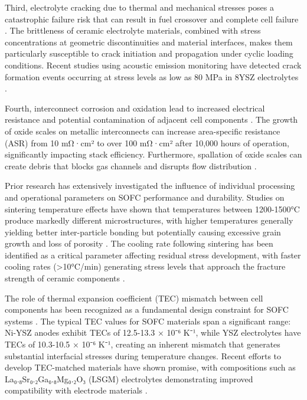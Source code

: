 \documentclass[conference]{IEEEtran}
\begin{document}
Third, electrolyte cracking due to thermal and mechanical stresses poses a catastrophic failure risk that can result in fuel crossover and complete cell failure \cite{nakajo2024mechanical}. The brittleness of ceramic electrolyte materials, combined with stress concentrations at geometric discontinuities and material interfaces, makes them particularly susceptible to crack initiation and propagation under cyclic loading conditions. Recent studies using acoustic emission monitoring have detected crack formation events occurring at stress levels as low as 80 MPa in 8YSZ electrolytes \cite{roberts2024fracture}.

Fourth, interconnect corrosion and oxidation lead to increased electrical resistance and potential contamination of adjacent cell components \cite{piccardo2024interconnect}. The growth of oxide scales on metallic interconnects can increase area-specific resistance (ASR) from 10 mΩ·cm² to over 100 mΩ·cm² after 10,000 hours of operation, significantly impacting stack efficiency. Furthermore, spallation of oxide scales can create debris that blocks gas channels and disrupts flow distribution \cite{leonard2024oxidation}.

Prior research has extensively investigated the influence of individual processing and operational parameters on SOFC performance and durability. Studies on sintering temperature effects have shown that temperatures between 1200-1500°C produce markedly different microstructures, with higher temperatures generally yielding better inter-particle bonding but potentially causing excessive grain growth and loss of porosity \cite{tietz2024sintering}. The cooling rate following sintering has been identified as a critical parameter affecting residual stress development, with faster cooling rates (>10°C/min) generating stress levels that approach the fracture strength of ceramic components \cite{fischer2024thermal}.

The role of thermal expansion coefficient (TEC) mismatch between cell components has been recognized as a fundamental design constraint for SOFC systems \cite{ferguson2024materials}. The typical TEC values for SOFC materials span a significant range: Ni-YSZ anodes exhibit TECs of 12.5-13.3 × 10⁻⁶ K⁻¹, while YSZ electrolytes have TECs of 10.3-10.5 × 10⁻⁶ K⁻¹, creating an inherent mismatch that generates substantial interfacial stresses during temperature changes. Recent efforts to develop TEC-matched materials have shown promise, with compositions such as La₀.₈Sr₀.₂Ga₀.₈Mg₀.₂O₃ (LSGM) electrolytes demonstrating improved compatibility with electrode materials \cite{ishihara2024lsgm}.
\end{document}
